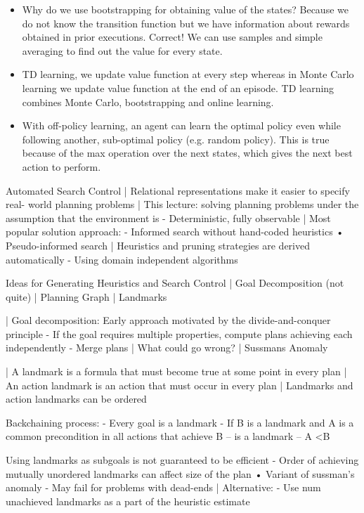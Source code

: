 \documentclass[10pt]{article}
\begin{document}
\begin{itemize}[label=\(\star\), leftmargin=1em, itemsep=-0.3em]
    \item Why do we use bootstrapping for obtaining value of the states?   Because we do not know the transition function but we have information about rewards obtained in prior executions. Correct! We can use samples and simple averaging to find out the value for every state.


    \item TD learning, we update value function at every step whereas in Monte Carlo learning we update value function at the end of an episode. TD learning combines Monte Carlo, bootstrapping and online learning.

    \item With off-policy learning, an agent can learn the optimal policy even while following another, sub-optimal policy (e.g. random policy). This is true because of the max operation over the next states, which gives the next best action to perform.



\end{itemize}

Automated Search Control
| Relational representations make it easier to specify real- world planning problems
| This lecture: solving planning problems under the assumption that the environment is
- Deterministic, fully observable
| Most popular solution approach:
- Informed search without hand-coded heuristics
• Pseudo-informed search
| Heuristics and pruning strategies are derived automatically
- Using domain independent algorithms

Ideas for Generating Heuristics and Search Control
| Goal Decomposition (not quite) | Planning Graph
| Landmarks


| Goal decomposition: Early approach motivated by the divide-and-conquer principle
- If the goal requires multiple properties, compute plans achieving each independently
- Merge plans
| What could go wrong? | Sussmans Anomaly


| A landmark is a formula that must become true at some point in every plan
| An action landmark is an action that must occur in every plan | Landmarks and action landmarks can be ordered

Backchaining process:
- Every goal is a landmark
- If B is a landmark and A is a common precondition in all actions that achieve B
-- is a landmark
 -- A <B

 Using landmarks as subgoals is not guaranteed to be efficient
- Order of achieving mutually unordered landmarks can affect size of the plan
• Variant of sussman’s anomaly
- May fail for problems with dead-ends
| Alternative:
- Use num unachieved landmarks as a part of the heuristic estimate
\end{document}

